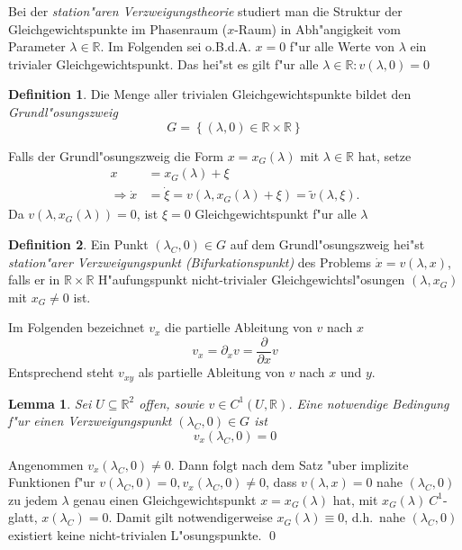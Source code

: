 \documentclass[a4paper, 13pt]{scrreprt}
\newtheorem{lemma}[theorem]{Lemma}
\theoremstyle{definition} \newtheorem{definition}{Definition}[section]
\newenvironment{beweis}[1][Beweis]{\begin{trivlist}
\item[\hskip \labelsep {\bfseries #1}]}{\end{trivlist}}
\newcommand{\RR}{\mathbb{R}}
\begin{document}
Bei der \emph{station"aren Verzweigungstheorie} studiert man die Struktur der Gleichgewichtspunkte im Phasenraum ($x$-Raum) in Abh"angigkeit vom Parameter $\lambda\in\RR$.
Im Folgenden sei o.B.d.A. $x=0$ f"ur alle Werte von $\lambda$ ein trivialer Gleichgewichtspunkt. Das hei"st es gilt f"ur alle $\lambda \in \RR: v(\lambda, 0) = 0$
\begin{definition}
Die Menge aller trivialen Gleichgewichtspunkte bildet den \emph{Grundl"osungszweig}
$$ G= \left \{ (\lambda, 0) \in \RR \times \RR \right \}$$
\end{definition}

Falls der Grundl"osungszweig die Form $x=x_G(\lambda)$ mit $\lambda\in\RR$ hat, setze
\begin{align*}
x &=x_G(\lambda)+\xi\\
\Rightarrow\dot x &= \dot\xi = v(\lambda,x_G(\lambda)+\xi) = \tilde v(\lambda,\xi).
\end{align*}
Da $v(\lambda, x_G(\lambda)) = 0$, ist $\xi = 0$ Gleichgewichtspunkt f"ur alle $\lambda$

\begin{definition}
Ein Punkt $(\lambda_C,0) \in G$ auf dem Grundl"osungszweig hei"st \emph{station"arer Verzweigungspunkt (Bifurkationspunkt)} des Problems $\dot x = v(\lambda, x)$, falls er in $\RR\times\RR$ H"aufungspunkt nicht-trivialer Gleichgewichtsl"osungen $(\lambda,x_G)$ mit ${x_G\neq 0}$ ist.
\end{definition}

Im Folgenden bezeichnet $v_x$ die partielle Ableitung von $v$ nach $x$
$$ v_x = \partial_x v = \frac{\partial}{\partial x} v$$
Entsprechend steht $v_{xy}$ als partielle Ableitung von $v$ nach $x$ und $y$.

\begin{lemma}
Sei $U\subseteq \RR^2$ offen, sowie $v \in C^1(U, \RR)$. Eine notwendige Bedingung f"ur einen  Verzweigungspunkt $(\lambda_C, 0)\in G$ ist
\[
v_x(\lambda_C,0) = 0
\]
\end{lemma}

\begin{beweis}
Angenommen $v_x(\lambda_C,0)\neq 0$. Dann folgt nach dem Satz "uber implizite Funktionen f"ur \(v(\lambda_C,0)=0, v_x(\lambda_C,0) \not= 0\), dass \(v(\lambda,x)=0\) nahe \((\lambda_C,0)\) zu jedem \(\lambda\) genau einen Gleichgewichtspunkt \(x=x_G(\lambda)\) hat, mit \(x_G(\lambda)\ C^1\)-glatt, \(x(\lambda_C)=0\).
 Damit gilt notwendigerweise $x_G(\lambda)\equiv 0$, d.h.\ nahe $(\lambda_C,0)$ existiert keine nicht-trivialen L"osungspunkte.
 \qed
\end{beweis}
\end{document}

